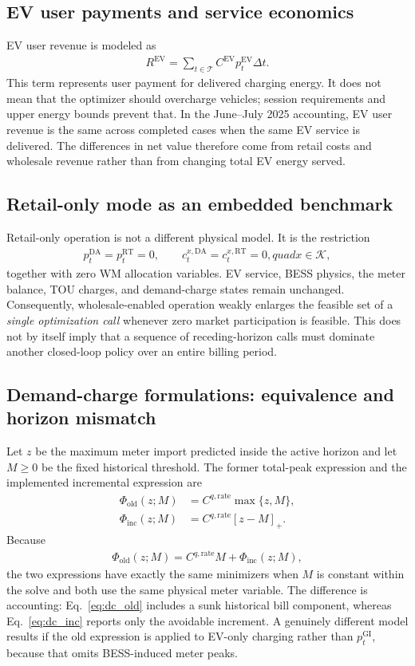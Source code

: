 \documentclass[final,5p,times]{elsarticle}
\newcommand{\DeltaT}{\Delta t}
\newcommand{\EV}{\mathrm{EV}}
\newcommand{\DA}{\mathrm{DA}}
\newcommand{\RT}{\mathrm{RT}}
\newcommand{\GI}{\mathrm{GI}}
\newcommand{\calT}{\mathcal{T}}
\newcommand{\calK}{\mathcal{K}}
\newcommand{\pos}[1]{\left[#1\right]_+}
\begin{document}
\subsection{EV user payments and service economics}
EV user revenue is modeled as
\begin{align}
R^{\EV}=\sum_{t\in\calT} C^{\EV}p_t^{\EV}\DeltaT.
\label{eq:ev_revenue_main}
\end{align}
This term represents user payment for delivered charging energy. It does not mean that the optimizer should overcharge vehicles; session requirements and upper energy bounds prevent that. In the June--July 2025 accounting, EV user revenue is the same across completed cases when the same EV service is delivered. The differences in net value therefore come from retail costs and wholesale revenue rather than from changing total EV energy served.

\subsection{Retail-only mode as an embedded benchmark}
Retail-only operation is not a different physical model. It is the restriction
\begin{align}
p_t^{\DA}=p_t^{\RT}=0,\qquad
c_t^{x,\DA}=c_t^{x,\RT}=0,quad x\in\calK,
\label{eq:retail_only}
\end{align}
together with zero WM allocation variables. EV service, BESS physics, the meter balance, TOU charges, and demand-charge states remain unchanged. Consequently, wholesale-enabled operation weakly enlarges the feasible set of a \emph{single optimization call} whenever zero market participation is feasible. This does not by itself imply that a sequence of receding-horizon calls must dominate another closed-loop policy over an entire billing period.

\subsection{Demand-charge formulations: equivalence and horizon mismatch}
Let $z$ be the maximum meter import predicted inside the active horizon and let $M\ge0$ be the fixed historical threshold. The former total-peak expression and the implemented incremental expression are
\begin{align}
\Phi_{\mathrm{old}}(z;M)&=C^{q,\mathrm{rate}}\max\{z,M\},\label{eq:dc_old}\\
\Phi_{\mathrm{inc}}(z;M)&=C^{q,\mathrm{rate}}\pos{z-M}.\label{eq:dc_inc}
\end{align}
Because
\begin{align}
\Phi_{\mathrm{old}}(z;M)=C^{q,\mathrm{rate}}M+\Phi_{\mathrm{inc}}(z;M),
\label{eq:dc_equivalence}
\end{align}
the two expressions have exactly the same minimizers when $M$ is constant within the solve and both use the same physical meter variable. The difference is accounting: Eq.~\eqref{eq:dc_old} includes a sunk historical bill component, whereas Eq.~\eqref{eq:dc_inc} reports only the avoidable increment. A genuinely different model results if the old expression is applied to EV-only charging rather than $p_t^{\GI}$, because that omits BESS-induced meter peaks.
\end{document}
